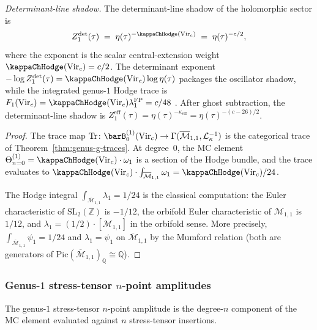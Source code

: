 \begin{computation}
\emph{Determinant-line shadow.}
The determinant-line shadow of the holomorphic sector is
\begin{equation}\label{eq:genus1-partition}
Z_1^{\mathrm{det}}(\tau)
\;=\;
\eta(\tau)^{-\kappaChHodge(\mathrm{Vir}_c)}
\;=\;
\eta(\tau)^{-c/2},
\end{equation}
where the exponent is the scalar central-extension weight
$\kappaChHodge(\mathrm{Vir}_c)=c/2$. The determinant exponent
$-\log Z_1^{\mathrm{det}}(\tau)
= \kappaChHodge(\mathrm{Vir}_c)\log\eta(\tau)$
packages the oscillator shadow, while the integrated genus-$1$
Hodge trace is
$F_1(\mathrm{Vir}_c)
= \kappaChHodge(\mathrm{Vir}_c)\lambda_1^{\mathrm{FP}} = c/48$ .
After ghost subtraction, the determinant-line shadow is
$Z_1^{\mathrm{eff}}(\tau) =
\eta(\tau)^{-\kappa_{\mathrm{eff}}} = \eta(\tau)^{-(c-26)/2}$.
\end{computation}

\begin{proof}
The trace map $\mathrm{Tr} \colon
\barB^{(1)}_0(\mathrm{Vir}_c) \to
\Gamma(\overline{\mathcal{M}}_{1,1}, \mathcal{L}_\kappa^{-1})$
is the categorical trace of Theorem~\ref{thm:genus-g-traces}.
At degree~$0$, the MC element $\Theta^{(1)}_{n=0}
= \kappaChHodge(\mathrm{Vir}_c) \cdot \omega_1$ is a section of the Hodge bundle,
and the trace evaluates to $\kappaChHodge(\mathrm{Vir}_c) \cdot
\int_{\overline{\mathcal{M}}_{1,1}} \omega_1 =
\kappaChHodge(\mathrm{Vir}_c)/24$.

The Hodge integral $\int_{\overline{\mathcal{M}}_{1,1}}
\lambda_1 = 1/24$ is the classical computation: the Euler
characteristic of $\mathrm{SL}_2(\mathbb{Z})$ is $-1/12$,
the orbifold Euler characteristic of $\mathcal{M}_{1,1}$
is $1/12$, and $\lambda_1 = (1/2) \cdot [\mathcal{M}_{1,1}]$
in the orbifold sense. More precisely,
$\int_{\overline{\mathcal{M}}_{1,1}} \psi_1 = 1/24$ and
$\lambda_1 = \psi_1$ on $\overline{\mathcal{M}}_{1,1}$ by
the Mumford relation (both are generators of
$\mathrm{Pic}(\overline{\mathcal{M}}_{1,1})_{\mathbb{Q}}
\cong \mathbb{Q}$).
\end{proof}

\subsubsection*{Genus-$1$ stress-tensor $n$-point amplitudes}

The genus-$1$ stress-tensor $n$-point amplitude is the degree-$n$ component
of the MC element evaluated against $n$ stress-tensor
insertions.

